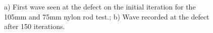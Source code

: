   \begin{figure}
 \begin{subfigmatrix}{2}
 \end{subfigmatrix}
 
    \caption
    { \label{fig:nylonExp3}
    a) First wave seen at the defect on the initial iteration for the 105mm and 75mm nylon rod test.; b) Wave recorded at the defect after 150 iterations.
  }
 \end{figure}
 